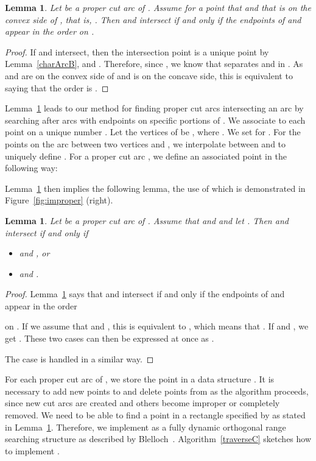 \documentclass{article}
\newtheorem{lemma}[theorem]{Lemma}
\begin{document}
\begin{lemma}\label{charArcB2}
Let  be a proper cut arc of .
Assume for a point  that  and that  is on the convex side of , that is, .
Then  and  intersect if and only if the endpoints of  and  appear in the order  on .
\end{lemma}

\begin{proof}
If  and  intersect, then the intersection point is a unique point  by Lemma~\ref{charArcB}, and .
Therefore, since , we know that  separates  and  in .
As  and  are on the convex side of  and  is on the concave side, this is equivalent to saying that the order is .
\end{proof}

Lemma~\ref{charArcB2} leads to our method for finding proper cut arcs intersecting
an arc  by searching after arcs with endpoints on specific portions of
.
We associate to each point  on  a unique number
. Let the vertices of  be
, where . We set
 for .
For the points  on the arc between two vertices  and
, we interpolate between  and  to uniquely define .
For a proper cut arc ,
we define an associated point 
in the following way:


Lemma~\ref{charArcB2} then implies the following lemma, the use of which is demonstrated in Figure~\ref{fig:improper} (right).

\begin{lemma}\label{charArcB3}
Let  be a proper cut arc of .
Assume that  and  and let .
Then  and  intersect
if and only if
\begin{itemize}
\item
 and , or

\item
 and .
\end{itemize}
\end{lemma}

\begin{proof}
Lemma~\ref{charArcB2} says that  and 
intersect if and only if the endpoints of  and  appear in the order

on .
If we assume that  and ,
this is equivalent to
, which means that
.
If  and , we get .
These two cases can then be expressed at once as .

The case  is handled in a similar way.
\end{proof}

For each proper cut arc  of , we store
the point  in a data structure .
It is necessary to add new points to and
delete points from  as the algorithm proceeds, since new
cut arcs are created and others become improper or completely removed.
We need to be able to find a point  in a rectangle
specified by  as stated in Lemma~\ref{charArcB3}.
Therefore, we implement  as a fully dynamic orthogonal
range searching structure as described by Blelloch~\cite{blelloch2008space}.
Algorithm~\ref{traverseC} sketches how to implement .
\end{document}
